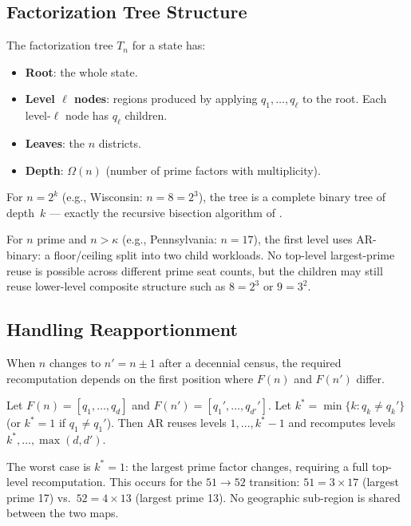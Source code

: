 \subsection{Factorization Tree Structure}
\label{sec:tree}

The factorization tree $T_n$ for a state has:
\begin{itemize}
  \item \textbf{Root}: the whole state.
  \item \textbf{Level $\ell$ nodes}: regions produced by applying $q_1, \ldots,
        q_\ell$ to the root. Each level-$\ell$ node has $q_\ell$ children.
  \item \textbf{Leaves}: the $n$ districts.
  \item \textbf{Depth}: $\Omega(n)$ (number of prime factors with multiplicity).
\end{itemize}

For $n = 2^k$ (e.g., Wisconsin: $n = 8 = 2^3$), the tree is a complete binary
tree of depth~$k$ --- exactly the recursive bisection algorithm of
\citet{dellaLibera2026mec}.

For $n$ prime and $n > \kappa$ (e.g., Pennsylvania: $n = 17$), the first level
uses AR-binary: a floor/ceiling split into two child workloads. No top-level
largest-prime reuse is possible across different prime seat counts, but the
children may still reuse lower-level composite structure such as $8 = 2^3$ or
$9 = 3^2$.

\subsection{Handling Reapportionment}
\label{sec:reapportionment}

When $n$ changes to $n' = n \pm 1$ after a decennial census, the required
recomputation depends on the first position where $F(n)$ and $F(n')$ differ.

\begin{proposition}
  Let $F(n) = [q_1, \ldots, q_d]$ and $F(n') = [q_1', \ldots, q_{d'}']$.
  Let $k^* = \min\{k : q_k \neq q_k'\}$ (or $k^* = 1$ if $q_1 \neq q_1'$).
  Then AR reuses levels $1, \ldots, k^*-1$ and recomputes levels
  $k^*, \ldots, \max(d, d')$.
\end{proposition}

The worst case is $k^* = 1$: the largest prime factor changes, requiring a
full top-level recomputation. This occurs for the $51 \to 52$ transition:
$51 = 3 \times 17$ (largest prime 17) vs.\ $52 = 4 \times 13$ (largest prime 13).
No geographic sub-region is shared between the two maps.

